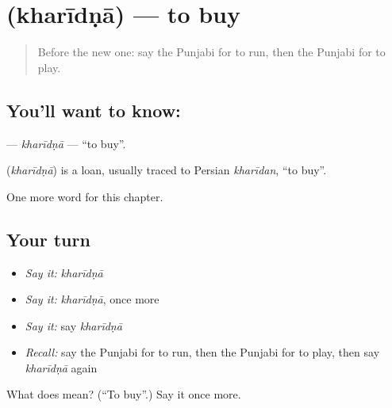 \section[\texorpdfstring{\pa{ਖ਼ਰੀਦਣਾ} (kharīdṇā)}{ਖ਼ਰੀਦਣਾ (kharīdṇā)}]{ (kharīdṇā) — to buy}

\label{lesson:PA-C57-kharidna}



\begin{quote}
Before the new one: say the Punjabi for to run, then the Punjabi for to play.
\end{quote}

\subsection*{You'll want to know: }
\textbf{} — \emph{kharīdṇā} — \textquotedblleft{}to buy\textquotedblright{}.

\begin{cousinweb}
\textbf{} (\emph{kharīdṇā}) is a loan, usually traced to Persian \emph{kharīdan}, \textquotedblleft{}to buy\textquotedblright{}.
\end{cousinweb}

\begin{grammarlens}[title={What you've built}]
One more word for this chapter.
\end{grammarlens}

\subsection*{Your turn}
\begin{itemize}
\raggedright
  \item \emph{Say it:} \emph{kharīdṇā}
  \item \emph{Say it:} \emph{kharīdṇā}, once more
  \item \emph{Say it:} say \emph{kharīdṇā}
  \item \emph{Recall:} say the Punjabi for to run, then the Punjabi for to play, then say \emph{kharīdṇā} again
\end{itemize}

\begin{tcolorbox}[breakable,colback=teal!4,colframe=teal!35!black,title={Before you move on}]
What does  mean? (\textquotedblleft{}To buy\textquotedblright{}.) Say it once more.
\end{tcolorbox}
